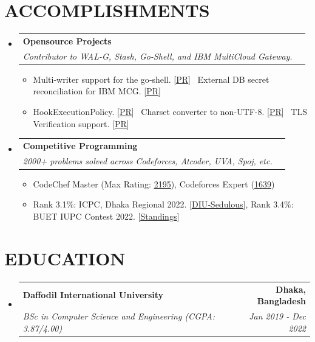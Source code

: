 \documentclass[letterpaper,11pt]{article}
\makeatletter
\newcommand{\resumeItem}[1]{
  \item\small{
    {#1 \vspace{-1pt}}
  }
}
\newcommand{\resumeSubheading}[4]{
  \vspace{-2pt}\item
    \begin{tabular*}{1.0\textwidth}[t]{l@{\extracolsep{\fill}}r}
      \textbf{\large#1} & \textbf{\small #2} \\
      \textit{\large#3} & \textit{\small #4} \\
    \end{tabular*}\vspace{-7pt}
}
\newcommand{\resumeSubHeadingListStart}{\begin{itemize}[leftmargin=0.0in, label={}]}
\newcommand{\resumeSubHeadingListEnd}{\end{itemize}}
\newcommand{\resumeItemListStart}{\begin{itemize}[leftmargin=0.1in]}
\newcommand{\resumeItemListEnd}{\end{itemize}\vspace{-5pt}}
\makeatother
\begin{document}
\section{\color{airforceblue}ACCOMPLISHMENTS}
  \resumeSubHeadingListStart
    \resumeSubheading
       {Opensource Projects}{}
       {Contributor to WAL-G, Stash, Go-Shell, and IBM MultiCloud Gateway.}{}
      \resumeItemListStart
          \resumeItem{\normalsize{Multi-writer support for the go‑shell. [\href{https://github.com/gomodules/go-sh/pull/4}{\underline{PR}}] \textbullet\, External DB secret reconciliation for IBM MCG. [\href{https://github.com/noobaa/noobaa-operator/pull/1669}{\underline{PR}}]}}
          \resumeItem{\normalsize{HookExecutionPolicy. [\href{https://github.com/stashed/apimachinery/pull/210}{\underline{PR}}] \textbullet\, Charset converter to non-UTF-8. [\href{https://github.com/wal-g/wal-g/pull/1705}{\underline{PR}}] \textbullet\, TLS Verification support. [\href{https://github.com/stashed/stash/pull/1554}{\underline{PR}}]}}
      \resumeItemListEnd  

    \resumeSubheading
       {Competitive Programming}{}
       {2000+ problems solved across Codeforces, Atcoder, UVA, Spoj, etc.}{}
      \resumeItemListStart
          \resumeItem{\normalsize{CodeChef Master (Max Rating: \href{https://www.codechef.com/users/arafatsunny}{\underline{2195}}), Codeforces Expert (\href{https://codeforces.com/profile/SU_N_NY}{\underline{1639}})}}
          \resumeItem{\normalsize{Rank 3.1\%: ICPC, Dhaka Regional 2022. [\href{https://algo.codemarshal.org/contests/icpc-dhaka-21/standingsURL}{\underline{DIU‑Sedulous}}], Rank 3.4\%: BUET IUPC Contest 2022. [\href{https://toph.co/c/buet-inter-university-2022/standings}{\underline{Standings}}]}}
      \resumeItemListEnd  
  \resumeSubHeadingListEnd
\vspace{-12pt}

\section{\color{airforceblue}EDUCATION}
  \resumeSubHeadingListStart
    \resumeSubheading
      {Daffodil International University}{Dhaka, Bangladesh}
      {BSc in Computer Science and Engineering (CGPA: 3.87/4.00)}{Jan 2019 - Dec 2022}
  \resumeSubHeadingListEnd
  \vspace{-10pt}
\end{document}
